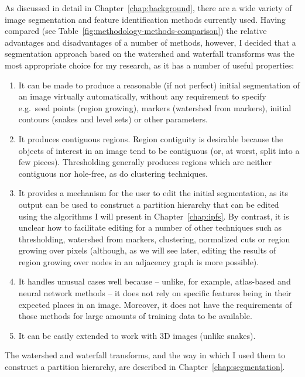 As discussed in detail in Chapter~\ref{chap:background}, there are a wide variety of image segmentation and feature identification methods currently used. Having compared (see Table~\ref{fig:methodology-methods-comparison}) the relative advantages and disadvantages of a number of methods, however, I decided that a segmentation approach based on the watershed and waterfall transforms was the most appropriate choice for my research, as it has a number of useful properties:
%
\begin{enumerate}

\item It can be made to produce a reasonable (if not perfect) initial segmentation of an image virtually automatically, without any requirement to specify e.g.~seed points (region growing), markers (watershed from markers), initial contours (snakes and level sets) or other parameters.

\item It produces contiguous regions. Region contiguity is desirable because the objects of interest in an image tend to be contiguous (or, at worst, split into a few pieces). Thresholding generally produces regions which are neither contiguous nor hole-free, as do clustering techniques.

\item It provides a mechanism for the user to edit the initial segmentation, as its output can be used to construct a partition hierarchy that can be edited using the algorithms I will present in Chapter~\ref{chap:ipfs}. By contrast, it is unclear how to facilitate editing for a number of other techniques such as thresholding, watershed from markers, clustering, normalized cuts or region growing over pixels (although, as we will see later, editing the results of region growing over nodes in an adjacency graph is more possible).

\item It handles unusual cases well because -- unlike, for example, atlas-based and neural network methods -- it does not rely on specific features being in their expected places in an image. Moreover, it does not have the requirements of those methods for large amounts of training data to be available.

\item It can be easily extended to work with 3D images (unlike snakes).

\end{enumerate}
%
The watershed and waterfall transforms, and the way in which I used them to construct a partition hierarchy, are described in Chapter~\ref{chap:segmentation}.

